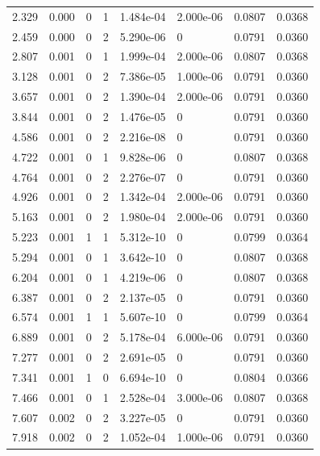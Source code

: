 \documentclass[preview]{standalone}
\begin{document}
{{\begin{tabular}{L{1.2cm}C{1.2cm} C{0.3cm}C{0.5cm} C{1.4cm}C{1.4cm} C{1.4cm}C{1.4cm}}
  2.329  &  0.000  & 0     &  1 &  1.484e-04  & 2.000e-06  & 0.0807 &  0.0368   \\ 
  2.459  &  0.000  & 0     &  2 &  5.290e-06  & 0  & 0.0791 &  0.0360   \\ 
  2.807  &  0.001  & 0     &  1 &  1.999e-04  & 2.000e-06  & 0.0807 &  0.0368   \\ 
  3.128  &  0.001  & 0     &  2 &  7.386e-05  & 1.000e-06  & 0.0791 &  0.0360   \\ 
  3.657  &  0.001  & 0     &  2 &  1.390e-04  & 2.000e-06  & 0.0791 &  0.0360   \\ 
  3.844  &  0.001  & 0     &  2 &  1.476e-05  & 0  & 0.0791 &  0.0360   \\ 
  4.586  &  0.001  & 0     &  2 &  2.216e-08  & 0  & 0.0791 &  0.0360   \\ 
  4.722  &  0.001  & 0     &  1 &  9.828e-06  & 0  & 0.0807 &  0.0368   \\ 
  4.764  &  0.001  & 0     &  2 &  2.276e-07  & 0  & 0.0791 &  0.0360   \\ 
  4.926  &  0.001  & 0     &  2 &  1.342e-04  & 2.000e-06  & 0.0791 &  0.0360   \\ 
  5.163  &  0.001  & 0     &  2 &  1.980e-04  & 2.000e-06  & 0.0791 &  0.0360   \\ 
  5.223  &  0.001  & 1     &  1 &  5.312e-10  & 0  & 0.0799 &  0.0364   \\ 
  5.294  &  0.001  & 0     &  1 &  3.642e-10  & 0  & 0.0807 &  0.0368   \\ 
  6.204  &  0.001  & 0     &  1 &  4.219e-06  & 0  & 0.0807 &  0.0368   \\ 
  6.387  &  0.001  & 0     &  2 &  2.137e-05  & 0  & 0.0791 &  0.0360   \\ 
  6.574  &  0.001  & 1     &  1 &  5.607e-10  & 0  & 0.0799 &  0.0364   \\ 
  6.889  &  0.001  & 0     &  2 &  5.178e-04  & 6.000e-06  & 0.0791 &  0.0360   \\ 
  7.277  &  0.001  & 0     &  2 &  2.691e-05  & 0  & 0.0791 &  0.0360   \\ 
  7.341  &  0.001  & 1     &  0 &  6.694e-10  & 0  & 0.0804 &  0.0366   \\ 
  7.466  &  0.001  & 0     &  1 &  2.528e-04  & 3.000e-06  & 0.0807 &  0.0368   \\ 
  7.607  &  0.002  & 0     &  2 &  3.227e-05  & 0  & 0.0791 &  0.0360   \\ 
  7.918  &  0.002  & 0     &  2 &  1.052e-04  & 1.000e-06  & 0.0791 &  0.0360   \\ 

\end{tabular}}}
\end{document}
